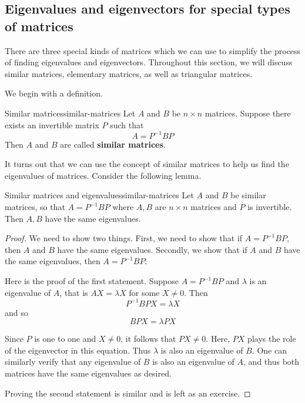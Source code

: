 \subsection{Eigenvalues and eigenvectors for special types of matrices}

There are three special kinds of matrices which we can use to simplify the process of finding eigenvalues and eigenvectors. 
Throughout this section, we will discuss similar matrices, elementary matrices, as well as triangular matrices. 

We begin with a definition.

\begin{definition}{Similar matrices}{similar-matrices}
Let $A$ and $B$ be $n \times n$ matrices. Suppose there exists an invertible matrix $P$ such that 
\begin{equation*}
A = P^{-1}BP
\end{equation*}
Then $A$ and $B$ are called \textbf{similar matrices}.
\end{definition}

It turns out that we can use the concept of similar matrices to help us find the eigenvalues
of matrices. Consider the following lemma.

\begin{lemma}{Similar matrices and eigenvalues}{similar-matrices}
Let $A$ and $B$ be similar matrices, so that $A=P^{-1}BP$ where $A,B$ are $n\times n$ matrices and $P$ is invertible. Then $A,B$ have the
same eigenvalues.
\end{lemma}

\begin{proof}
We need to show two things. First, we need to show that if
$A=P^{-1}BP$, then $A$ and $B$ have the same eigenvalues.  Secondly,
we show that if $A$ and $B$ have the same eigenvalues, then
$A=P^{-1}BP$.

Here is the proof of the first statement. 
Suppose $A = P^{-1}BP$ and $\lambda$ is an eigenvalue of $A$, that is $AX=\lambda X$ for some $X\neq 0$. Then
\begin{equation*}
P^{-1}BPX=\lambda X
\end{equation*}
and so
\begin{equation*}
BPX=\lambda PX
\end{equation*}

Since $P$ is one to one and $X \neq 0$, it follows that $PX \neq
0$. Here, $PX$ plays the role of the eigenvector in this equation.
Thus $\lambda$ is also an eigenvalue of $B$. One can similarly verify
that any eigenvalue of $B$ is also an eigenvalue of $A$, and thus both
matrices have the same eigenvalues as desired.

Proving the second statement is similar and is left as an exercise. 
\end{proof}

